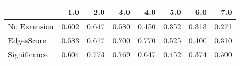 \begin{tabular}{lrrrrrrr}
\toprule
{} &   1.0 &   2.0 &   3.0 &   4.0 &   5.0 &   6.0 &   7.0 \\
\midrule
No Extension & 0.602 & 0.647 & 0.580 & 0.450 & 0.352 & 0.313 & 0.271 \\
EdgesScore   & 0.583 & 0.617 & 0.700 & 0.770 & 0.525 & 0.400 & 0.310 \\
Significance & 0.604 & 0.773 & 0.769 & 0.647 & 0.452 & 0.374 & 0.300 \\
\bottomrule
\end{tabular}
